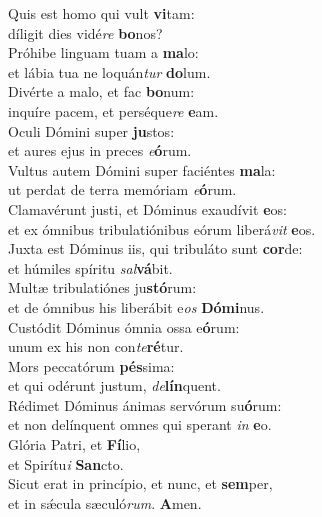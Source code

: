 \evenverse Quis est homo qui vult \textbf{vi}tam:~\*\\
\evenverse díligit dies vidé\textit{re} \textbf{bo}nos?\\
\oddverse Próhibe linguam tuam a \textbf{ma}lo:~\*\\
\oddverse et lábia tua ne loquán\textit{tur} \textbf{do}lum.\\
\evenverse Divérte a malo, et fac \textbf{bo}num:~\*\\
\evenverse inquíre pacem, et perséque\textit{re} \textbf{e}am.\\
\oddverse Oculi Dómini super \textbf{ju}stos:~\*\\
\oddverse et aures ejus in preces \textit{e}\textbf{ó}rum.\\
\evenverse Vultus autem Dómini super faciéntes \textbf{ma}la:~\*\\
\evenverse ut perdat de terra memóriam \textit{e}\textbf{ó}rum.\\
\oddverse Clamavérunt justi, et Dóminus exaudívit \textbf{e}os:~\*\\
\oddverse et ex ómnibus tribulatiónibus eórum liberá\textit{vit} \textbf{e}os.\\
\evenverse Juxta est Dóminus iis, qui tribuláto sunt \textbf{cor}de:~\*\\
\evenverse et húmiles spíritu \textit{sal}\textbf{vá}bit.\\
\oddverse Multæ tribulatiónes ju\textbf{stó}rum:~\*\\
\oddverse et de ómnibus his liberábit e\textit{os} \textbf{Dó}\textbf{mi}nus.\\
\evenverse Custódit Dóminus ómnia ossa e\textbf{ó}rum:~\*\\
\evenverse unum ex his non con\textit{te}\textbf{ré}tur.\\
\oddverse Mors peccatórum \textbf{pés}sima:~\*\\
\oddverse et qui odérunt justum, \textit{de}\textbf{lín}quent.\\
\evenverse Rédimet Dóminus ánimas servórum su\textbf{ó}rum:~\*\\
\evenverse et non delínquent omnes qui sperant \textit{in} \textbf{e}o.\\
\oddverse Glória Patri, et \textbf{Fí}lio,~\*\\
\oddverse et Spirítu\textit{i} \textbf{San}cto.\\
\evenverse Sicut erat in princípio, et nunc, et \textbf{sem}per,~\*\\
\evenverse et in sǽcula sæculó\textit{rum}. \textbf{A}men.\\
